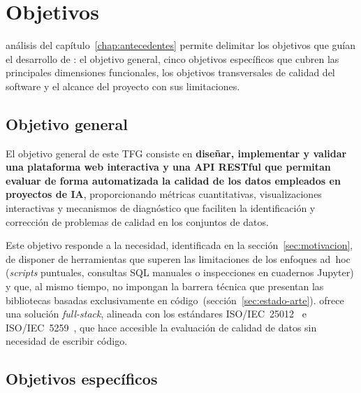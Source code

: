 \chapter{Objetivos}
\label{chap:objetivos}

 análisis del capítulo~\ref{chap:antecedentes} permite delimitar
los objetivos que guían el desarrollo de \dataqual: el objetivo general, cinco
objetivos específicos que cubren las principales dimensiones funcionales, los
objetivos transversales de calidad del software y el alcance del proyecto con
sus limitaciones.


\section{Objetivo general}
\label{sec:objetivo-general}

El objetivo general de este \ac{TFG} consiste en \textbf{diseñar, implementar
y validar una plataforma web interactiva y una \ac{API} \ac{REST}ful que
permitan evaluar de forma automatizada la calidad de los datos empleados en
proyectos de \ac{IA}}, proporcionando métricas cuantitativas, visualizaciones
interactivas y mecanismos de diagnóstico que faciliten la identificación y
corrección de problemas de calidad en los conjuntos de datos.

Este objetivo responde a la necesidad, identificada en la
sección~\ref{sec:motivacion}, de disponer de herramientas que superen las
limitaciones de los enfoques ad~hoc (\emph{scripts} puntuales, consultas
\ac{SQL} manuales o inspecciones en cuadernos Jupyter) y que, al mismo
tiempo, no impongan la barrera técnica que presentan las bibliotecas basadas
exclusivamente en código~(sección~\ref{sec:estado-arte}).  \dataqual ofrece una solución \emph{full-stack}, alineada con los estándares
\ac{ISO}/IEC~25012~\citep{iso25012} e \ac{ISO}/IEC~5259~\citep{iso5259}, que
hace accesible la evaluación de calidad de datos sin necesidad de escribir
código.


\section{Objetivos específicos}
\label{sec:objetivos-especificos}

